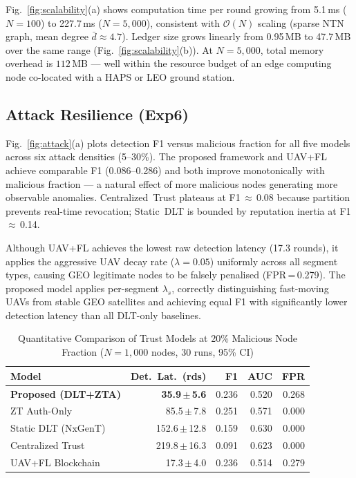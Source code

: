 Fig.~\ref{fig:scalability}(a) shows computation time per round
growing from 5.1\,ms ($N=100$) to 227.7\,ms ($N=5{,}000$),
consistent with $\mathcal{O}(N)$ scaling (sparse NTN graph, mean
degree $\bar{d}\approx 4.7$).  Ledger size grows linearly from
0.95\,MB to 47.7\,MB over the same range (Fig.~\ref{fig:scalability}(b)).
At $N=5{,}000$, total memory overhead is $112$\,MB — well within
the resource budget of an edge computing node co-located with a
HAPS or LEO ground station.

\subsection{Attack Resilience (Exp6)}

Fig.~\ref{fig:attack}(a) plots detection F1 versus malicious
fraction for all five models across six attack densities (5--30\%).
The proposed framework and UAV+FL achieve comparable F1 (0.086--0.286)
and both improve monotonically with malicious fraction — a natural
effect of more malicious nodes generating more observable anomalies.
Centralized~Trust plateaus at F1\,$\approx$\,0.08 because partition
prevents real-time revocation; Static~DLT is bounded by reputation
inertia at F1\,$\approx$\,0.14.

Although UAV+FL achieves the lowest raw detection latency (17.3
rounds), it applies the aggressive UAV decay rate ($\lambda=0.05$)
uniformly across all segment types, causing GEO legitimate nodes to
be falsely penalised (FPR\,=\,0.279).  The proposed model applies
per-segment $\lambda_s$, correctly distinguishing fast-moving UAVs
from stable GEO satellites and achieving equal F1 with significantly
lower detection latency than all DLT-only baselines.


\begin{table}[t]
\centering
\caption{Quantitative Comparison of Trust Models at 20\% Malicious
         Node Fraction ($N=1{,}000$ nodes, 30 runs, 95\% CI)}
\label{tab:comparison}
\begin{tabular}{lrrrr}
\toprule
Model & Det.\ Lat.\ (rds) & F1 & AUC & FPR \\
\midrule
\textbf{Proposed (DLT+ZTA)} & \textbf{35.9\,$\pm$\,5.6}  & 0.236 & 0.520 & 0.268 \\
ZT Auth-Only                 & 85.5\,$\pm$\,7.8            & 0.251 & 0.571 & 0.000 \\
Static DLT (NxGenT)          & 152.6\,$\pm$\,12.8          & 0.159 & 0.630 & 0.000 \\
Centralized Trust            & 219.8\,$\pm$\,16.3          & 0.091 & 0.623 & 0.000 \\
UAV+FL Blockchain            & 17.3\,$\pm$\,4.0            & 0.236 & 0.514 & 0.279 \\
\bottomrule
\end{tabular}
\end{table}

